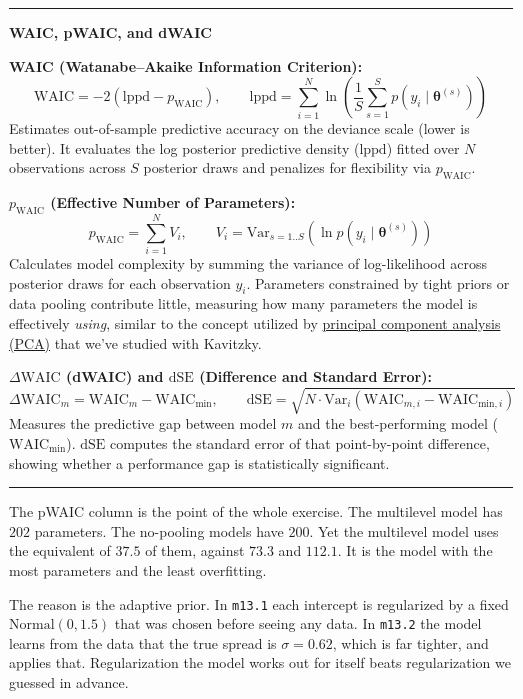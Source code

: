 \documentclass[11pt,a4paper]{article}
\newenvironment{infobox}[1]{%
  \par\vspace{6pt}\begin{center}\begin{minipage}{0.96\textwidth}%
  \rule{\linewidth}{0.8pt}\vspace{3pt}\par
  \textbf{#1}\par\vspace{4pt}\small
}{%
  \par\vspace{3pt}\rule{\linewidth}{0.8pt}%
  \end{minipage}\end{center}\vspace{6pt}\par
}
\begin{document}
\begin{infobox}{WAIC, pWAIC, and dWAIC}
\textbf{WAIC (Watanabe--Akaike Information Criterion):}
\[
  \text{WAIC} = -2 \left( \text{lppd} - p_{\text{WAIC}} \right), \qquad \text{lppd} = \sum_{i=1}^N \ln \left( \frac{1}{S}\sum_{s=1}^S p(y_i \mid \boldsymbol{\theta}^{(s)}) \right)
\]
Estimates out-of-sample predictive accuracy on the deviance scale (lower is better). It evaluates the log posterior predictive density ($\text{lppd}$) fitted over $N$ observations across $S$ posterior draws and penalizes for flexibility via $p_{\text{WAIC}}$.

\smallskip
\textbf{$p_{\text{WAIC}}$ (Effective Number of Parameters):}
\[
  p_{\text{WAIC}} = \sum_{i=1}^N V_i, \qquad V_i = \text{Var}_{s=1..S}\left( \ln p(y_i \mid \boldsymbol{\theta}^{(s)}) \right)
\]
Calculates model complexity by summing the variance of log-likelihood across posterior draws for each observation $y_i$. Parameters constrained by tight priors or data pooling contribute little, measuring how many parameters the model is effectively \emph{using}, similar to the concept utilized by \underline{principal component analysis (PCA)} that we've studied with Kavitzky.

\smallskip
\textbf{$\Delta\text{WAIC}$ (dWAIC) and $\text{dSE}$ (Difference and Standard Error):}
\[
  \Delta\text{WAIC}_m = \text{WAIC}_m - \text{WAIC}_{\text{min}}, \qquad \text{dSE} = \sqrt{N \cdot \text{Var}_{i}\left( \text{WAIC}_{m,i} - \text{WAIC}_{\text{min},i} \right)}
\]
Measures the predictive gap between model $m$ and the best-performing model ($\text{WAIC}_{\text{min}}$). $\text{dSE}$ computes the standard error of that point-by-point difference, showing whether a performance gap is statistically significant.
\end{infobox}

The pWAIC column is the point of the whole exercise. The multilevel model has
$202$ parameters. The no-pooling models have $200$. Yet the multilevel model
uses the equivalent of $37.5$ of them, against $73.3$ and $112.1$. It is the
model with the most parameters and the least overfitting.

The reason is the adaptive prior. In \texttt{m13.1} each intercept is regularized
by a fixed $\text{Normal}(0,1.5)$ that was chosen before seeing any data. In
\texttt{m13.2} the model learns from the data that the true spread is
$\sigma = 0.62$, which is far tighter, and applies that. Regularization the
model works out for itself beats regularization we guessed in advance.
\end{document}
